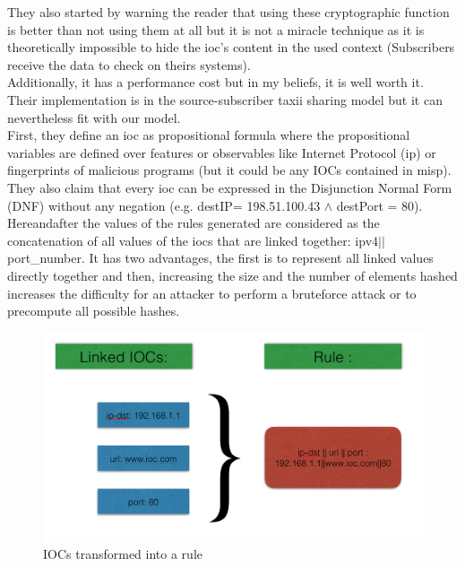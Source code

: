\documentclass{eplmastersthesis}
\begin{document}
They also started by warning the reader that using these cryptographic function is better than not using them at all but it is not a miracle technique as it is theoretically impossible to hide the \gls{ioc}’s content in the used context (Subscribers receive the data to check on theirs systems).\\
Additionally, it has a performance cost but in my beliefs, it is well worth it.\\ Their implementation is in the source-subscriber \gls{taxii} sharing model but it can nevertheless fit with our model.\\
First, they define an \gls{ioc} as propositional formula where the propositional variables are defined over features or observables like Internet Protocol (\gls{ip}) or fingerprints of malicious programs (but it could be any IOCs contained in \gls{misp}). They also claim that every \gls{ioc} can be expressed in the Disjunction Normal Form (DNF) without any negation (e.g. destIP= 198.51.100.43 $\land$ destPort = 80).\\
Hereandafter the values of the rules generated are considered as the concatenation of all values of the \gls{ioc}s that are linked together: \gls{ipv4}$||$port\_number. It has two advantages, the first is to represent all linked values directly together and then, increasing the size and the number of elements hashed increases the difficulty for an attacker to perform a bruteforce attack or to precompute all possible hashes.\\

\begin{figure}[h!]
\begin{center}
	\includegraphics[scale=0.5]{res/ioc-rules}
	\caption{IOCs transformed into a rule}
	\label{IOC-To-Rule}
\end{center}
\end{figure}
\end{document}
